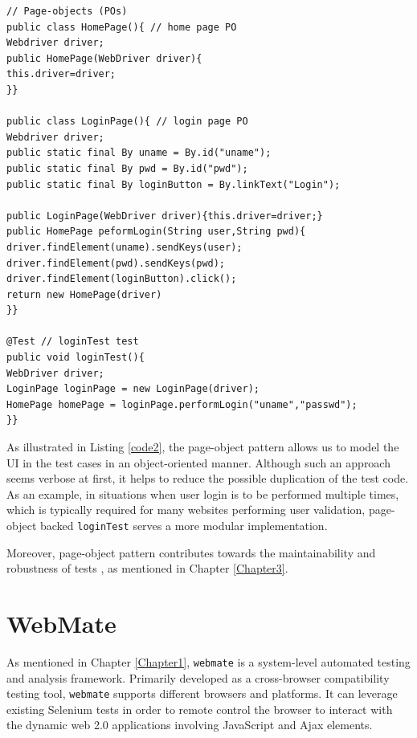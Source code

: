 \begin{center}
\begin{scriptsize}
\centering
\lstset{
  basicstyle=\ttfamily,
  columns=fullflexible,
  keepspaces=true,
}
  
\begin{lstlisting}[caption=Page-Objects design for \texttt{loginTest},label=code2]
// Page-objects (POs)
public class HomePage(){ // home page PO
Webdriver driver;
public HomePage(WebDriver driver){
this.driver=driver;
}}

public class LoginPage(){ // login page PO
Webdriver driver;
public static final By uname = By.id("uname");
public static final By pwd = By.id("pwd");
public static final By loginButton = By.linkText("Login");

public LoginPage(WebDriver driver){this.driver=driver;}
public HomePage peformLogin(String user,String pwd){
driver.findElement(uname).sendKeys(user);
driver.findElement(pwd).sendKeys(pwd);
driver.findElement(loginButton).click();
return new HomePage(driver)
}}

@Test // loginTest test
public void loginTest(){
WebDriver driver;
LoginPage loginPage = new LoginPage(driver);
HomePage homePage = loginPage.performLogin("uname","passwd");
}}
\end{lstlisting}
\end{scriptsize} 
\end{center}
 
As illustrated in Listing \ref{code2}, the page-object pattern allows us to model the UI in the test cases in an object-oriented manner. Although such an approach seems verbose at first, it helps to reduce the possible duplication of the test code. As an example, in situations when user login is to be performed multiple times, which is typically required for many websites performing user validation, page-object backed \texttt{loginTest} serves a more modular implementation. 

Moreover, page-object pattern contributes towards the maintainability and robustness of tests \cite{leottaPObs}, as mentioned in Chapter \ref{Chapter3}.


\section{WebMate}
\label{sec:WebMate}
As mentioned in Chapter \ref{Chapter1}, \texttt{webmate} \cite{webmate} is a system-level automated testing and analysis framework. Primarily developed as a cross-browser compatibility testing tool, \texttt{webmate} supports different browsers and platforms. It can leverage existing Selenium tests in order to remote control the browser to interact with the dynamic web 2.0 applications involving JavaScript and Ajax elements. 

